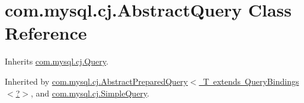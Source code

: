 \hypertarget{classcom_1_1mysql_1_1cj_1_1_abstract_query}{}\section{com.\+mysql.\+cj.\+Abstract\+Query Class Reference}
\label{classcom_1_1mysql_1_1cj_1_1_abstract_query}


Inherits \mbox{\hyperlink{interfacecom_1_1mysql_1_1cj_1_1_query}{com.\+mysql.\+cj.\+Query}}.



Inherited by \mbox{\hyperlink{classcom_1_1mysql_1_1cj_1_1_abstract_prepared_query}{com.\+mysql.\+cj.\+Abstract\+Prepared\+Query$<$ T extends Query\+Bindings$<$?$>$}}, and \mbox{\hyperlink{classcom_1_1mysql_1_1cj_1_1_simple_query}{com.\+mysql.\+cj.\+Simple\+Query}}.

